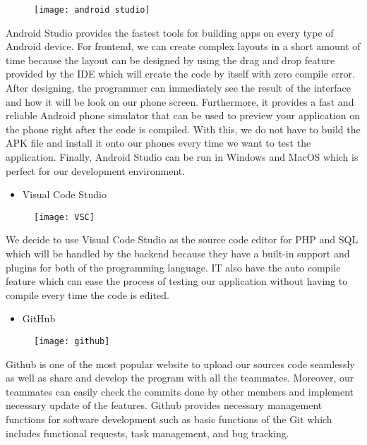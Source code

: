 \documentclass[conference]{IEEEtran}
\begin{document}
\par \begin{figure}[h!]
\texttt{[image: android studio]}
\centering
\end{figure}Android Studio provides the fastest tools for building apps on every type of Android device. For frontend, we can create complex layouts in a short amount of time because the layout can be designed by using the drag and drop feature provided by the IDE which will create the code by itself with zero compile error. After designing, the programmer can immediately see the result of the interface and how it will be look on our phone screen. Furthermore, it provides a fast and reliable Android phone simulator that can be used to preview your application on the phone right after the code is compiled. With this, we do not have to build the APK file and install it onto our phones every time we want to test the application. Finally, Android Studio can be run in Windows and MacOS which is perfect for our development environment.\\
\begin{itemize}
\item Visual Code Studio
\end{itemize}
\par \begin{figure}[h!]
\texttt{[image: VSC]}
\centering
\end{figure} We decide to use Visual Code Studio as the source code editor for PHP and SQL which will be handled by the backend because they have a built-in support and plugins for both of the programming language. IT also have the auto compile feature which can ease the process of testing our application without having to compile every time the code is edited. \\
\begin{itemize}
\item GitHub
\end{itemize}
\par \begin{figure}[h!]
\texttt{[image: github]}
\centering
\end{figure} Github is one of the most popular website to upload our sources code seamlessly as well as share and develop the program with all the teammates. Moreover, our teammates can easily check the commits done by other members and implement necessary update of the features. Github provides necessary management functions for software development such as basic functions of the Git which includes functional requests, task management, and bug tracking.\\
\end{document}
